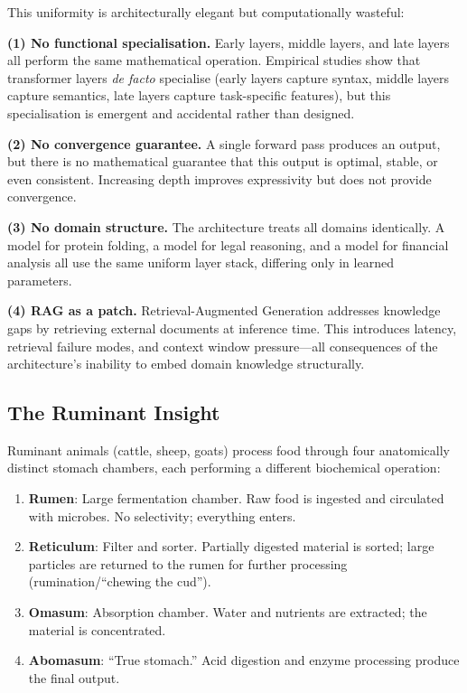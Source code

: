 \documentclass[twocolumn,10pt]{article}
\theoremstyle{remark}
\begin{document}
This uniformity is architecturally elegant but computationally wasteful:

\textbf{(1) No functional specialisation.}  Early layers, middle layers, and late layers all perform the same mathematical operation.  Empirical studies show that transformer layers \emph{de facto} specialise (early layers capture syntax, middle layers capture semantics, late layers capture task-specific features), but this specialisation is emergent and accidental rather than designed.

\textbf{(2) No convergence guarantee.}  A single forward pass produces an output, but there is no mathematical guarantee that this output is optimal, stable, or even consistent.  Increasing depth improves expressivity but does not provide convergence.

\textbf{(3) No domain structure.}  The architecture treats all domains identically.  A model for protein folding, a model for legal reasoning, and a model for financial analysis all use the same uniform layer stack, differing only in learned parameters.

\textbf{(4) RAG as a patch.}  Retrieval-Augmented Generation \cite{lewis2020rag} addresses knowledge gaps by retrieving external documents at inference time.  This introduces latency, retrieval failure modes, and context window pressure---all consequences of the architecture's inability to embed domain knowledge structurally.

\subsection{The Ruminant Insight}

Ruminant animals (cattle, sheep, goats) process food through four anatomically distinct stomach chambers, each performing a different biochemical operation:

\begin{enumerate}[label=(\roman*)]
    \item \textbf{Rumen}: Large fermentation chamber.  Raw food is ingested and circulated with microbes.  No selectivity; everything enters.
    \item \textbf{Reticulum}: Filter and sorter.  Partially digested material is sorted; large particles are returned to the rumen for further processing (rumination/``chewing the cud'').
    \item \textbf{Omasum}: Absorption chamber.  Water and nutrients are extracted; the material is concentrated.
    \item \textbf{Abomasum}: ``True stomach.''  Acid digestion and enzyme processing produce the final output.
\end{enumerate}
\end{document}
